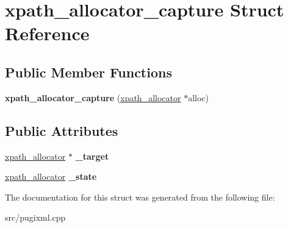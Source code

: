 \hypertarget{structxpath__allocator__capture}{}\section{xpath\+\_\+allocator\+\_\+capture Struct Reference}
\label{structxpath__allocator__capture}
\subsection*{Public Member Functions}
\begin{DoxyCompactItemize}
\item 
\mbox{\label{structxpath__allocator__capture_af6925e08c811c0cbda74d4da5b9f2eed}} 
{\bfseries xpath\+\_\+allocator\+\_\+capture} (\hyperlink{classxpath__allocator}{xpath\+\_\+allocator} $\ast$alloc)
\end{DoxyCompactItemize}
\subsection*{Public Attributes}
\begin{DoxyCompactItemize}
\item 
\mbox{\label{structxpath__allocator__capture_a382acca931c691699ec84a03fb060cf4}} 
\hyperlink{classxpath__allocator}{xpath\+\_\+allocator} $\ast$ {\bfseries \+\_\+target}
\item 
\mbox{\label{structxpath__allocator__capture_a275859dc99681c12b42ee4f51b713d39}} 
\hyperlink{classxpath__allocator}{xpath\+\_\+allocator} {\bfseries \+\_\+state}
\end{DoxyCompactItemize}


The documentation for this struct was generated from the following file\+:\begin{DoxyCompactItemize}
\item 
src/pugixml.\+cpp\end{DoxyCompactItemize}
